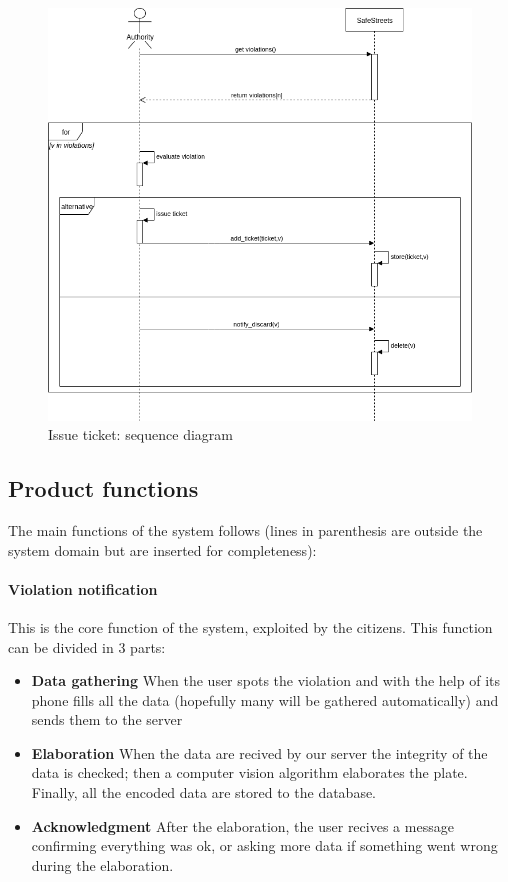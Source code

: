 \documentclass{article}
\begin{document}
	\begin{figure}
		\includegraphics[width=\linewidth]{UML/Issue_ticket_sequence_diagram.png}
		\caption{Issue ticket: sequence diagram}
	\end{figure}
		
	\newpage
	
	\subsection{Product functions}
	The main functions of the system follows (lines in parenthesis are outside the system domain but are inserted for completeness):
		\paragraph{Violation notification}
			This is the core function of the system, exploited by the citizens.
			This function can be divided in 3 parts:
				\begin{itemize}
					\item \textbf{Data gathering}
					When the user spots the violation and with the help of its phone fills all the data (hopefully many will be gathered automatically) and sends them to the server
					\item \textbf{Elaboration}
					When the data are recived by our server the integrity of the data is checked; then a computer vision algorithm elaborates the plate. Finally, all the encoded data are stored to the database.
					\item \textbf{Acknowledgment}
					After the elaboration, the user recives a message confirming everything was ok, or asking more data if something went wrong during the elaboration.
				\end{itemize}
				
\end{document}
